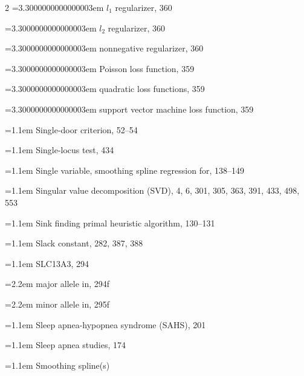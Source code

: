 \begin{multicols}{2}
\noindent\hangindent=3.3000000000000003em \hspace*{2.2em}$l_{1}$ regularizer, 360\par
\noindent\hangindent=3.3000000000000003em \hspace*{2.2em}$l_{2}$ regularizer, 360\par
\noindent\hangindent=3.3000000000000003em \hspace*{2.2em}nonnegative regularizer, 360\par
\noindent\hangindent=3.3000000000000003em \hspace*{2.2em}Poisson loss function, 359\par
\noindent\hangindent=3.3000000000000003em \hspace*{2.2em}quadratic loss functions, 359\par
\noindent\hangindent=3.3000000000000003em \hspace*{2.2em}support vector machine loss function, 359\par
\noindent\hangindent=1.1em Single-door criterion, 52--54\par
\noindent\hangindent=1.1em Single-locus test, 434\par
\noindent\hangindent=1.1em Single variable, smoothing spline regression for, 138--149\par
\noindent\hangindent=1.1em Singular value decomposition (SVD), 4, 6, 301, 305, 363, 391, 433, 498, 553\par
\noindent\hangindent=1.1em Sink finding primal heuristic algorithm, 130--131\par
\noindent\hangindent=1.1em Slack constant, 282, 387, 388\par
\noindent\hangindent=1.1em SLC13A3, 294\par
\noindent\hangindent=2.2em \hspace*{1.1em}major allele in, 294f\par
\noindent\hangindent=2.2em \hspace*{1.1em}minor allele in, 295f\par
\noindent\hangindent=1.1em Sleep apnea-hypopnea syndrome (SAHS), 201\par
\noindent\hangindent=1.1em Sleep apnea studies, 174\par
\noindent\hangindent=1.1em Smoothing spline(s)\par

\end{multicols}
